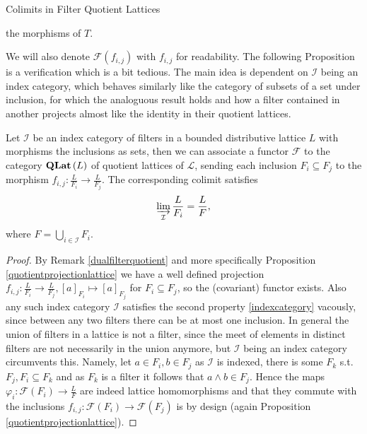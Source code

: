 \begin{subsection}{Colimits in Filter Quotient Lattices}
\begin{definition}
        the morphisms of \( T \).
    \end{definition}
    We will also denote \( \mathcal{F}(f_{i,j}) \) with \( f_{i,j} \) for readability.
    The following Proposition is a verification which is a bit tedious. 
    The main idea is dependent on \( \mathcal{I} \) being an index category, which behaves similarly like the category of subsets of a set under inclusion, for which the analoguous result holds and how a filter contained in another projects almost like the identity in their quotient lattices.
    \begin{proposition} \label{colimitforquotientlattice}
        Let \( \mathcal{I} \) be an index category of filters in a bounded distributive lattice \( L \)
        with morphisms the inclusions as sets, then we can associate a functor \( \mathcal{F} \) to the category \( \textbf{QLat}\left (L \right) \) 
        of quotient lattices of \( \mathcal{L} \), sending each inclusion \( F_i \subseteq F_j \) to the morphism 
        \( f_{i,j} : \frac{L}{F_i} \to \frac{L}{F_j} \).
        The corresponding colimit satisfies 
        \[ 
            \varinjlim_{\mathcal{I}} \frac{L}{F_i} = \frac{L}{F},
        \]
        where \( F = \bigcup_{i \in \mathcal{I}} F_i \).
    \end{proposition}
    \begin{proof}
        By Remark \ref{dualfilterquotient} and more specifically Proposition \ref{quotientprojectionlattice}
        we have a well defined projection \( f_{i,j} : \frac{L}{F_i} \to \frac{L}{F_j}, [a]_{F_i} \mapsto [a]_{F_j} \) for \( F_i \subseteq F_j \),
        so the (covariant) functor exists.
        Also any such index category \( \mathcal{I} \) satisfies the second property \ref{indexcategory} vacously, 
        since between any two filters there can be at most one inclusion.
        \newline
        In general the union of filters in a lattice is not a filter, since the meet of elements in distinct filters
        are not necessarily in the union anymore, but \( \mathcal{I} \) being an index category circumvents this.
        Namely, let \( a \in F_i, b \in F_j  \) as \( \mathcal{I} \) is indexed, there is some 
        \( F_k \) s.t. \( F_j, F_i \subseteq F_k \) and as \( F_k \) is a filter it follows that \( a \wedge b \in F_j \).
        Hence the maps \( \varphi_i : \mathcal{F}(F_i) \to \frac{L}{F} \) are indeed lattice homomorphisms 
        and that they commute with the inclusions \( f_{i,j} : \mathcal{F}(F_i) \to \mathcal{F}(F_j) \) is by design
        (again Proposition \ref{quotientprojectionlattice}).

\end{proof}
\end{subsection}
